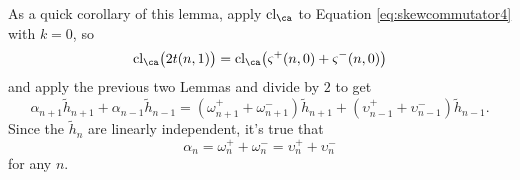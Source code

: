 \begin{remark}
As a quick corollary of this lemma, apply $\textrm{cl}_\ca$ to Equation \eqref{eq:skewcommutator4} with $k=0$, so
\[
\textrm{cl}_\ca \big( 2 t(n, 1) \big) = \textrm{cl}_\ca \big( \varsigma^+ (n, 0) + \varsigma^- (n, 0) \big)
\]
and apply the previous two Lemmas and divide by $2$ to get
\[
\alpha_{n+1} \tilde{h}_{n+1} + \alpha_{n-1} \tilde{h}_{n-1} = (\omega^+_{n+1} + \omega^-_{n+1}) \tilde{h}_{n+1} + (\upsilon^+_{n-1} + \upsilon^-_{n-1}) \tilde{h}_{n-1}.
\]
Since the $\tilde{h}_n$ are linearly independent, it's true that 
\begin{equation}
\alpha_n = \omega_n^+ + \omega_n^- = \upsilon_n^+ + \upsilon_n^-
\end{equation}
for any $n$. 
\end{remark}


